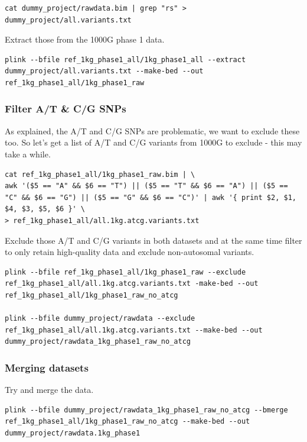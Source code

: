 \documentclass[
]{book}
\begin{document}
\begin{lstlisting}
cat dummy_project/rawdata.bim | grep "rs" > dummy_project/all.variants.txt
\end{lstlisting}

Extract those from the 1000G phase 1 data.

\begin{lstlisting}
plink --bfile ref_1kg_phase1_all/1kg_phase1_all --extract dummy_project/all.variants.txt --make-bed --out ref_1kg_phase1_all/1kg_phase1_raw
\end{lstlisting}

\hypertarget{filter-at-cg-snps}{%
\subsubsection{Filter A/T \& C/G SNPs}\label{filter-at-cg-snps}}

As explained, the A/T and C/G SNPs are problematic, we want to exclude these too. So let's get a list of A/T and C/G variants from 1000G to exclude - this may take a while.

\begin{lstlisting}
cat ref_1kg_phase1_all/1kg_phase1_raw.bim | \
awk '($5 == "A" && $6 == "T") || ($5 == "T" && $6 == "A") || ($5 == "C" && $6 == "G") || ($5 == "G" && $6 == "C")' | awk '{ print $2, $1, $4, $3, $5, $6 }' \
> ref_1kg_phase1_all/all.1kg.atcg.variants.txt
\end{lstlisting}

Exclude those A/T and C/G variants in both datasets and at the same time filter to only retain high-quality data and exclude non-autosomal variants.

\begin{lstlisting}
plink --bfile ref_1kg_phase1_all/1kg_phase1_raw --exclude ref_1kg_phase1_all/all.1kg.atcg.variants.txt -make-bed --out ref_1kg_phase1_all/1kg_phase1_raw_no_atcg

plink --bfile dummy_project/rawdata --exclude ref_1kg_phase1_all/all.1kg.atcg.variants.txt --make-bed --out dummy_project/rawdata_1kg_phase1_raw_no_atcg
\end{lstlisting}

\hypertarget{merging-datasets}{%
\subsubsection{Merging datasets}\label{merging-datasets}}

Try and merge the data.

\begin{lstlisting}
plink --bfile dummy_project/rawdata_1kg_phase1_raw_no_atcg --bmerge ref_1kg_phase1_all/1kg_phase1_raw_no_atcg --make-bed --out dummy_project/rawdata.1kg_phase1
\end{lstlisting}
\end{document}

